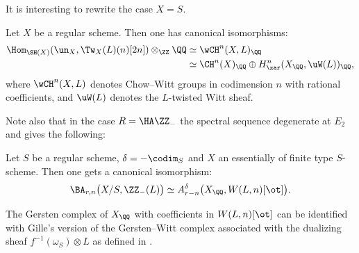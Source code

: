 It is interesting to rewrite the case $X=S$.
\begin{cor}
Let $X$ be a regular scheme. Then one has canonical isomorphisms:
\begin{align*}
\Hom_{\SH(X)}(\un_X,\Tw_X(L)(n)[2n]) \otimes_\ZZ\QQ &\simeq \wCH^n(X,L)_\QQ \\
&\simeq \CH^n(X)_\QQ \oplus H^n_\zar(X_\QQ,\uW(L))_\QQ,
\end{align*}
where $\wCH^n(X,L)$ denotes Chow--Witt groups in codimension $n$ with rational coefficients,
and $\uW(L)$ denotes the $L$-twisted Witt sheaf.
\end{cor}

Note also that in the case $R=\HA \ZZ_-$ the spectral sequence degenerate at $E_2$
and gives the following:
\begin{thm}\label{thm:biv_A1minus&Wittcoh}
Let $S$ be a regular scheme, $\delta=-\codim_S$ and $X$ an essentially of finite type $S$-scheme.
Then one gets a canonical isomorphism:
\[
\BA_{r,n}\big(X/S,\ZZ_-(L)\big) \simeq
A^\delta_{r-n}\big(X_\QQ,W(L,n)[\ot]\big).
\]
\end{thm}

\begin{rem}
The Gersten complex of $X_\QQ$ with coefficients in $W(L,n)[\ot]$ can be identified
with Gille's version of the Gersten--Witt complex associated with the dualizing sheaf
$f^{-1}(\omega_S) \otimes L$ as defined in \cite{Gille}.
\end{rem}

